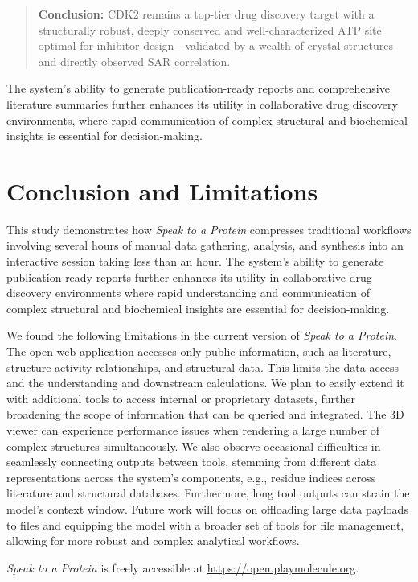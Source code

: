 \documentclass{article}
\begin{document}
\begin{quote}
\textbf{Conclusion:} CDK2 remains a top-tier drug discovery target with a structurally robust, deeply conserved and well-characterized ATP site optimal for inhibitor design—validated by a wealth of crystal structures and directly observed SAR correlation.
\end{quote}

The system's ability to generate publication-ready reports and comprehensive literature summaries further enhances its utility in collaborative drug discovery environments, where rapid communication of complex structural and biochemical insights is essential for decision-making.

\section{Conclusion and Limitations}\label{sec:discussion}

This study demonstrates how \emph{Speak to a Protein} compresses traditional workflows involving several hours of manual data gathering, analysis, and synthesis into an interactive session taking less than an hour. The system's ability to generate publication-ready reports further enhances its utility in collaborative drug discovery environments where rapid understanding and communication of complex structural and biochemical insights are essential for decision-making.

We found the following limitations in the current version of \emph{Speak to a Protein}. The open web application accesses only public information, such as literature, structure-activity relationships, and structural data. This limits the data access and the understanding and downstream calculations. We plan to easily extend it with additional tools to access internal or proprietary datasets, further broadening the scope of information that can be queried and integrated.
 The 3D viewer can experience performance issues when rendering a large number of complex structures simultaneously. We also observe occasional difficulties in seamlessly connecting outputs between tools, stemming from different data representations across the system's components, e.g., residue indices across literature and structural databases. Furthermore, long tool outputs can strain the model's context window. Future work will focus on offloading large data payloads to files and equipping the model with a broader set of tools for file management, allowing for more robust and complex analytical workflows.

\emph{Speak to a Protein} is freely accessible at \url{https://open.playmolecule.org}. 
\end{document}
